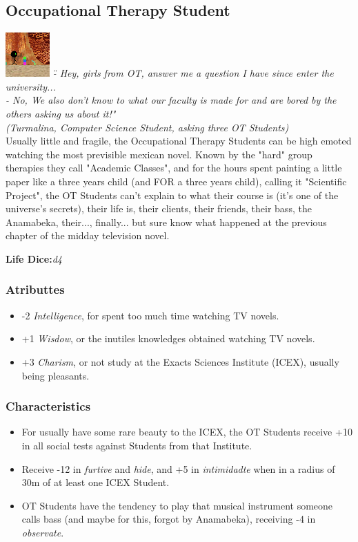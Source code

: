 \documentclass[ letterpaper,12pt]{article}
\begin{document}
\subsection{Occupational Therapy Student}
\includegraphics{../data/classes/Img/to.png}
{\it \" - Hey,  girls  from  OT, answer me  a question  I  have  since  enter  the university...\\
        - No,  We  also  don't  know to  what our faculty is made for and are bored  by the others asking us about it!"\\
        (Turmalina,  Computer  Science   Student, asking three OT Students)}\\

Usually   little    and    fragile,   the Occupational Therapy Students can be high emoted  watching  the  most  previsible mexican novel. Known by the "hard"  group therapies  they  call "Academic Classes", and for the hours spent painting a little paper like a three years child (and FOR a three   years    child),    calling    it "Scientific  Project",  the  OT  Students can't  explain  to  what  their course is (it's one  of  the  universe's  secrets), their  life  is,  their  clients,   their friends,   their   bass,  the  Anamabeka, their..., finally... but sure  know  what happened at the previous  chapter  of the midday television novel.

{\bf Life Dice:}{\it d4}\\

\subsubsection{Atributtes}
\begin{itemize}
\item{-2 {\it Intelligence}, for spent too much time watching TV novels.}
\item{+1 {\it Wisdow}, or the inutiles knowledges obtained watching TV novels.}
\item{+3 {\it Charism}, or  not  study  at   the Exacts Sciences Institute (ICEX), usually being pleasants.}
\end{itemize}


\subsubsection{Characteristics}
\begin{itemize}
\item{For usually have some rare  beauty to the ICEX, the OT Students receive +10 in  all social tests against Students  from  that Institute.}
\item{Receive -12 in {\it furtive} and {\it hide}, and +5 in {\it intimidadte} when in a radius of 30m of at least one ICEX Student.}
\item{OT Students have  the  tendency  to  play that  musical  instrument  someone  calls bass  (and  maybe  for  this,  forgot  by Anamabeka), receiving -4 in {\it observate}.}
\end{itemize}
\end{document}
